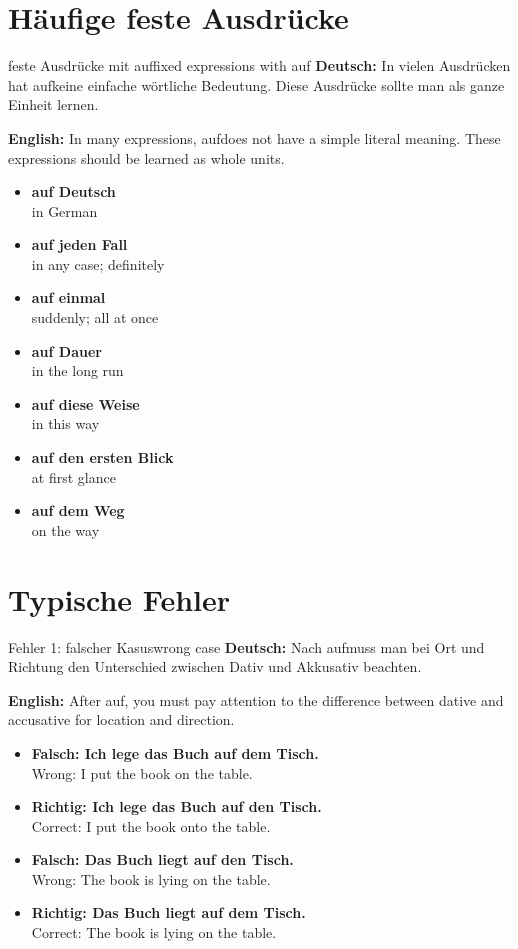 \documentclass[a4paper,11pt]{article}
\newcommand{\GermanText}[1]{\textbf{Deutsch: }#1\par}
\newcommand{\EnglishText}[1]{{\small\color{SoftGray}\textbf{English: }#1\par}}
\newcommand{\ExampleItem}[2]{\item \textbf{#1}\\{\small\color{SoftGray}#2}}
\begin{document}
    \section{Häufige feste Ausdrücke}

    \begin{grammarentry}{feste Ausdrücke mit auf}{fixed expressions with auf}
        \GermanText{In vielen Ausdrücken hat \glqq auf\grqq keine einfache wörtliche Bedeutung. Diese Ausdrücke sollte man als ganze Einheit lernen.}
        \EnglishText{In many expressions, \glqq auf\grqq does not have a simple literal meaning. These expressions should be learned as whole units.}

        \begin{exbox}
            \begin{itemize}
                \ExampleItem{auf Deutsch}{in German}
                \ExampleItem{auf jeden Fall}{in any case; definitely}
                \ExampleItem{auf einmal}{suddenly; all at once}
                \ExampleItem{auf Dauer}{in the long run}
                \ExampleItem{auf diese Weise}{in this way}
                \ExampleItem{auf den ersten Blick}{at first glance}
                \ExampleItem{auf dem Weg}{on the way}
            \end{itemize}
        \end{exbox}
    \end{grammarentry}

    \section{Typische Fehler}

    \begin{grammarentry}{Fehler 1: falscher Kasus}{wrong case}
        \GermanText{Nach \glqq auf\grqq muss man bei Ort und Richtung den Unterschied zwischen Dativ und Akkusativ beachten.}
        \EnglishText{After \glqq auf\grqq, you must pay attention to the difference between dative and accusative for location and direction.}

        \begin{exbox}
            \begin{itemize}
                \ExampleItem{Falsch: Ich lege das Buch auf dem Tisch.}{Wrong: I put the book on the table.}
                \ExampleItem{Richtig: Ich lege das Buch auf den Tisch.}{Correct: I put the book onto the table.}
                \ExampleItem{Falsch: Das Buch liegt auf den Tisch.}{Wrong: The book is lying on the table.}
                \ExampleItem{Richtig: Das Buch liegt auf dem Tisch.}{Correct: The book is lying on the table.}
            \end{itemize}
        \end{exbox}
    \end{grammarentry}
\end{document}
